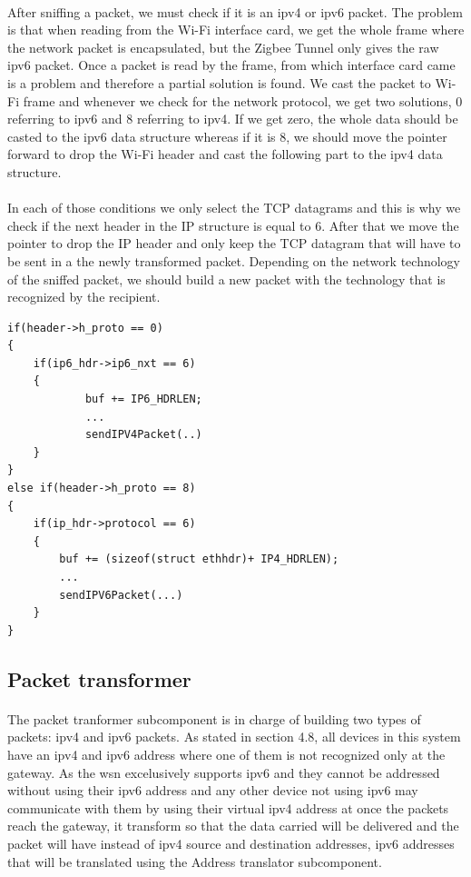 \documentclass[oneside,12pt,a4paper,final]{book}
\begin{document}
\paragraph{}
After sniffing a packet, we must check if it is an \gls{ipv4} or \gls{ipv6} packet. The problem is that when reading from the Wi-Fi interface card, we get the whole frame where the network packet is encapsulated, but the Zigbee Tunnel only gives the raw \gls{ipv6} packet. Once a packet is read by the frame, from which interface card came is a problem and therefore a partial solution is found. We cast the packet to Wi-Fi frame and whenever we check for the network protocol, we get two solutions, 0 referring to \gls{ipv6} and 8 referring to \gls{ipv4}.
If we get zero, the whole data should be casted to the \gls{ipv6} data structure whereas if it is 8, we should move the pointer forward to drop the Wi-Fi header and cast the following part to the \gls{ipv4} data structure.
\paragraph{}
In each of those conditions we only select the TCP datagrams and this is why we check if the next header in the IP structure is equal to 6. After that we move the pointer to drop the IP header and only keep the TCP datagram that will have to be sent in a the newly transformed packet. Depending on the network technology of the sniffed packet, we should build a new packet with the technology that is recognized by the recipient.

\begin{lstlisting}
if(header->h_proto == 0) 
{
	if(ip6_hdr->ip6_nxt == 6)
	{
			buf += IP6_HDRLEN;
			... 			
			sendIPV4Packet(..)
	}
}
else if(header->h_proto == 8)
{
	if(ip_hdr->protocol == 6)
	{
		buf += (sizeof(struct ethhdr)+ IP4_HDRLEN);		
		...
		sendIPV6Packet(...)
	}
}
\end{lstlisting}

\subsection{Packet transformer}
\paragraph{}
The packet tranformer subcomponent is in charge of building two types of packets: \gls{ipv4} and \gls{ipv6} packets. As stated in section 4.8, all devices in this system have an \gls{ipv4} and \gls{ipv6} address where one of them is not recognized only at the gateway. As the \gls{wsn} excelusively supports \gls{ipv6} and they cannot be addressed without using their \gls{ipv6} address and any other device not using \gls{ipv6} may communicate with them by using their virtual \gls{ipv4} address at once the packets reach the gateway, it transform so that the data carried will be delivered and the packet will have instead of \gls{ipv4} source and destination addresses, \gls{ipv6} addresses that will be translated using the Address translator subcomponent.
\end{document}

